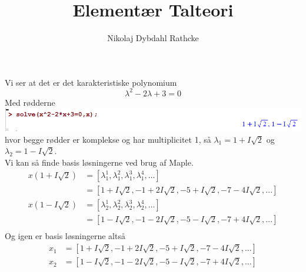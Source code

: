 \documentclass[12pt]{article}
\title{Elementær Talteori}
\author{Nikolaj Dybdahl Rathcke}
\begin{document}
Vi ser at det er det karakteristiske polynomium
$$\lambda^2-2\lambda+3=0$$
Med rødderne\\
\includegraphics[width=\textwidth]{2}\\
hvor begge rødder er komplekse og har multiplicitet 1, så $\lambda_1=1+I\sqrt{2}$ og $\lambda_2=1-I\sqrt{2}$.\\
Vi kan så finde basis løsningerne ved brug af Maple.
\begin{align*}
x(1+I\sqrt{2})&=[\lambda_1^1,\lambda_1^2,\lambda_1^3,\lambda_1^4,...] \\
&=[1+I\sqrt{2},-1+2I\sqrt{2},-5+I\sqrt{2},-7-4I\sqrt{2},...] \\
x(1-I\sqrt{2})&=[\lambda_2^1,\lambda_2^2,\lambda_2^3,\lambda_2^4,...] \\
&=[1-I\sqrt{2},-1-2I\sqrt{2},-5-I\sqrt{2},-7+4I\sqrt{2},...] \\
\end{align*}
Og igen er basis løsningerne altså
\begin{align*}
x_1&=[1+I\sqrt{2},-1+2I\sqrt{2},-5+I\sqrt{2},-7-4I\sqrt{2},...] \\
x_2&=[1-I\sqrt{2},-1-2I\sqrt{2},-5-I\sqrt{2},-7+4I\sqrt{2},...] 
\end{align*}
\end{document}
